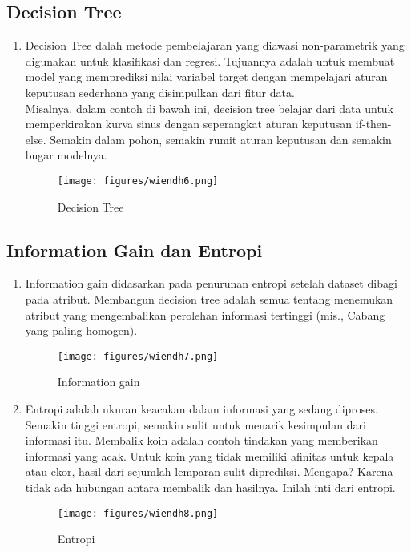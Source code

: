 \subsection{Decision Tree }
\begin{enumerate}
\item Decision Tree dalah metode pembelajaran yang diawasi non-parametrik yang digunakan untuk klasifikasi dan regresi. Tujuannya adalah untuk membuat model yang memprediksi nilai variabel target dengan mempelajari aturan keputusan sederhana yang disimpulkan dari fitur data.\\
Misalnya, dalam contoh di bawah ini, decision tree belajar dari data untuk memperkirakan kurva sinus dengan seperangkat aturan keputusan if-then-else. Semakin dalam pohon, semakin rumit aturan keputusan dan semakin bugar modelnya.
\begin{figure}[ht]
\centering
\texttt{[image: figures/wiendh6.png]}
\caption{Decision Tree}
\label{contoh}
\end{figure}
\end{enumerate}

\subsection{Information Gain dan Entropi}
\begin{enumerate}
\item Information gain didasarkan pada penurunan entropi setelah dataset dibagi pada atribut. Membangun decision tree adalah semua tentang menemukan atribut yang mengembalikan perolehan informasi tertinggi (mis., Cabang yang paling homogen).
\begin{figure}[ht]
\centering
\texttt{[image: figures/wiendh7.png]}
\caption{Information gain}
\label{contoh}
\end{figure}
\item Entropi adalah ukuran keacakan dalam informasi yang sedang diproses. Semakin tinggi entropi, semakin sulit untuk menarik kesimpulan dari informasi itu. Membalik koin adalah contoh tindakan yang memberikan informasi yang acak. Untuk koin yang tidak memiliki afinitas untuk kepala atau ekor, hasil dari sejumlah lemparan sulit diprediksi. Mengapa? Karena tidak ada hubungan antara membalik dan hasilnya. Inilah inti dari entropi.
\begin{figure}[ht]
\centering
\texttt{[image: figures/wiendh8.png]}
\caption{Entropi}
\label{contoh}
\end{figure}
\end{enumerate}

